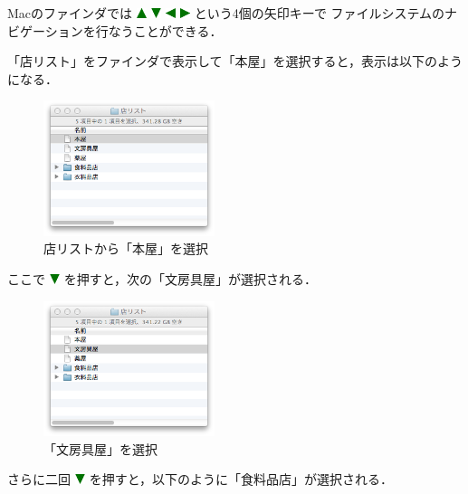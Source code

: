 \documentclass[twoside]{wiss}
\def\figwidth{50mm}
\def\up{ \includegraphics[width=3mm,bb=0 0 36 36]{figures/uptriangle.pdf} }
\def\down{ \includegraphics[width=3mm,bb=0 0 36 36]{figures/downtriangle.pdf} }
\def\right{ \includegraphics[width=3mm,bb=0 0 36 36]{figures/righttriangle.pdf} }
\def\left{ \includegraphics[width=3mm,bb=0 0 36 36]{figures/lefttriangle.pdf} }
\begin{document}
Macのファインダでは
{\up}{\down}{\left}{\right}という4個の矢印キーで
ファイルシステムのナビゲーションを行なうことができる．

「店リスト」をファインダで表示して「本屋」を選択すると，表示は以下のようになる．

\begin{figure}[H]
\centerline{\includegraphics[width=\figwidth,bb=0 0 344 272]{figures/9b121bec45e5b480e5ac64fdd0f82592.png}}
\caption{店リストから「本屋」を選択}
\label{screenshot2}
\end{figure}

\noindent
ここで{\down}を押すと，次の「文房具屋」が選択される．

\begin{figure}[H]
\centerline{\includegraphics[width=\figwidth,bb=0 0 344 272]{figures/f43016d1b524baf414f2c32c48fe9588.png}}
\caption{「文房具屋」を選択}
\label{screenshot3}
\end{figure}

\noindent
さらに二回{\down}を押すと，以下のように「食料品店」が選択される．
\end{document}

